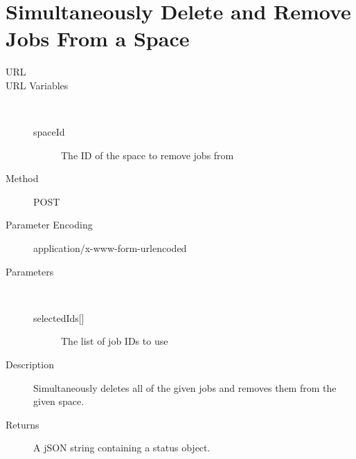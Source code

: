 \section{Simultaneously Delete and Remove Jobs From a Space}
\begin{description}
\item [URL] 
\item [URL Variables] \
	\begin{description}
	\item [spaceId]  The ID of the space to remove jobs from
	\end{description}
\item [Method] POST
\item [Parameter Encoding] application/x-www-form-urlencoded
\item [Parameters] \
	\begin{description}
	\item [{selectedIds[]}]  The list of job IDs to use
	\end{description}
\item [Description] Simultaneously deletes all of the given jobs and removes them from the given space.
\item [Returns] A jSON string containing a status object.
\end{description}


